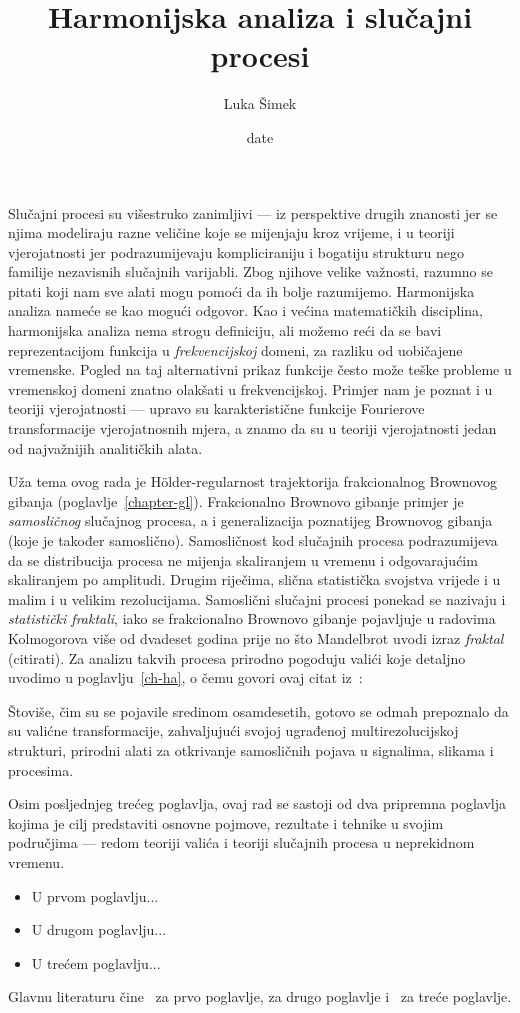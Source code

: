 \documentclass[a4paper,twoside,12pt]{memoir}
\title{Harmonijska analiza i slu\v{c}ajni procesi}
\author{Luka Šimek}
\date{date}
\numberwithin{teorem}{section}
\numberwithin{equation}{chapter}
\numberwithin{figure}{chapter}
\numberwithin{table}{chapter}
\newcommand{\holder}{H\" older}
\begin{document}
\nocite{*}
\frontmatter

\begin{intro}
	Slučajni procesi su višestruko zanimljivi --- iz perspektive drugih znanosti jer
	se njima modeliraju razne veličine koje se mijenjaju kroz vrijeme, i u teoriji vjerojatnosti
	jer podrazumijevaju kompliciraniju i bogatiju strukturu nego familije nezavisnih
	slučajnih varijabli. Zbog njihove velike važnosti, razumno se pitati koji nam
	sve alati mogu pomoći da ih bolje razumijemo. Harmonijska analiza nameće se kao mogući odgovor.
	Kao i većina matematičkih disciplina, harmonijska analiza nema strogu definiciju, ali
	možemo reći da se bavi reprezentacijom funkcija u \emph{frekvencijskoj} domeni, za razliku
	od uobičajene vremenske. Pogled na taj alternativni prikaz funkcije često može teške
	probleme u vremenskoj domeni znatno olakšati u frekvencijskoj. Primjer nam
	je poznat i u teoriji vjerojatnosti --- upravo su karakteristične funkcije Fourierove transformacije
	vjerojatnosnih mjera, a znamo da su u teoriji vjerojatnosti jedan od najvažnijih analitičkih alata.

	Uža tema ovog rada je \holder -regularnost trajektorija frakcionalnog Brownovog gibanja (poglavlje~\ref{chapter-gl}).
	Frakcionalno Brownovo gibanje primjer je \emph{samosličnog} slučajnog procesa, a i generalizacija poznatijeg Brownovog gibanja (koje je također samoslično). Samosličnost kod slučajnih procesa
	podrazumijeva da se distribucija procesa ne mijenja skaliranjem u vremenu i odgovarajućim skaliranjem po amplitudi. Drugim riječima, slična statistička svojstva
	vrijede i u malim i u velikim rezolucijama. Samoslični slučajni procesi ponekad se nazivaju i \emph{statistički fraktali}, iako se frakcionalno Brownovo gibanje
	pojavljuje u radovima Kolmogorova više od dvadeset godina prije no što Mandelbrot uvodi izraz \emph{fraktal} (citirati). Za analizu takvih procesa
	prirodno pogoduju valići koje detaljno uvodimo u poglavlju~\ref{ch-ha}, o čemu govori ovaj citat iz~\cite[str.~22.]{flandrin}:
	\begin{displayquote}
		Štoviše, čim su se pojavile sredinom osamdesetih, gotovo se odmah prepoznalo da su valićne transformacije,
		zahvaljujući svojoj ugrađenoj multirezolucijskoj strukturi, prirodni alati
		za otkrivanje samosličnih pojava u signalima, slikama i procesima.
	\end{displayquote}

	\bigskip
	Osim posljednjeg trećeg poglavlja, ovaj rad se sastoji od dva pripremna poglavlja kojima je cilj
	predstaviti osnovne pojmove, rezultate i tehnike u svojim područjima --- redom teoriji valića i teoriji
	slučajnih procesa u neprekidnom vremenu.
	\begin{itemize}
		\item U prvom poglavlju...

		\item U drugom poglavlju...

		\item U trećem poglavlju...
	\end{itemize}

	Glavnu literaturu čine~\cite{daub} za prvo poglavlje, \cite{sato, em, sarapa} za drugo poglavlje i~\cite{se, ayache} za treće poglavlje.
\end{intro}
\end{document}

